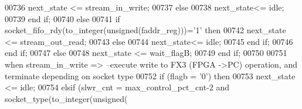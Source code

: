 \begin{DoxyCode}
00736                     \textcolor{vhdlchar}{next_state} \textcolor{vhdlchar}{<=} \textcolor{vhdlchar}{stream\_in\_write};
00737                 \textcolor{keywordflow}{else} 
00738                     \textcolor{vhdlchar}{next_state}\textcolor{vhdlchar}{<=} \textcolor{vhdlchar}{idle};
00739                 \textcolor{keywordflow}{end} \textcolor{keywordflow}{if};
00740             \textcolor{keywordflow}{else} 
00741                 \textcolor{keywordflow}{if} \textcolor{vhdlchar}{socket_fifo_rdy}\textcolor{vhdlchar}{(}\textcolor{vhdlchar}{to\_integer}\textcolor{vhdlchar}{(}\textcolor{comment}{unsigned}\textcolor{vhdlchar}{(}\textcolor{vhdlchar}{faddr_reg}\textcolor{vhdlchar}{)}\textcolor{vhdlchar}{)}\textcolor{vhdlchar}{)}\textcolor{vhdlchar}{=}\textcolor{vhdlchar}{'}\textcolor{vhdllogic}{}\textcolor{vhdllogic}{1}\textcolor{vhdlchar}{'} \textcolor{keywordflow}{then} 
00742                     \textcolor{vhdlchar}{next_state} \textcolor{vhdlchar}{<=} \textcolor{vhdlchar}{stream\_out\_read};
00743                 \textcolor{keywordflow}{else} 
00744                     \textcolor{vhdlchar}{next_state}\textcolor{vhdlchar}{<=} \textcolor{vhdlchar}{idle};
00745                 \textcolor{keywordflow}{end} \textcolor{keywordflow}{if};
00746             \textcolor{keywordflow}{end} \textcolor{keywordflow}{if};
00747         \textcolor{keywordflow}{else}
00748             \textcolor{vhdlchar}{next_state} \textcolor{vhdlchar}{<=} \textcolor{vhdlchar}{wait\_flagB};
00749         \textcolor{keywordflow}{end} \textcolor{keywordflow}{if};
00750         
00751     \textcolor{keywordflow}{when} \textcolor{vhdlchar}{stream\_in\_write} \textcolor{vhdlchar}{=}\textcolor{vhdlchar}{>}\textcolor{keyword}{         --execute write to FX3 (FPGA ->PC) operation, and terminate depending
       on socket type}
00752         \textcolor{keywordflow}{if} \textcolor{vhdlchar}{(}\textcolor{vhdlchar}{flagb} \textcolor{vhdlchar}{=} \textcolor{vhdlchar}{'}\textcolor{vhdllogic}{}\textcolor{vhdllogic}{0}\textcolor{vhdlchar}{'}\textcolor{vhdlchar}{)} \textcolor{keywordflow}{then}           
00753          \textcolor{vhdlchar}{next_state} \textcolor{vhdlchar}{<=} \textcolor{vhdlchar}{idle};
00754         \textcolor{keywordflow}{elsif} \textcolor{vhdlchar}{(}\textcolor{vhdlchar}{slwr_cnt} \textcolor{vhdlchar}{=} \textcolor{vhdlchar}{max_control_pct_cnt}\textcolor{vhdlchar}{-}\textcolor{vhdllogic}{}\textcolor{vhdllogic}{2} \textcolor{keywordflow}{and} \textcolor{vhdlchar}{socket_type}\textcolor{vhdlchar}{(}\textcolor{vhdlchar}{to\_integer}\textcolor{vhdlchar}{(}\textcolor{comment}{unsigned}\textcolor{vhdlchar}{(}\textcolor{vhdlchar}{
}
\end{DoxyCode}
